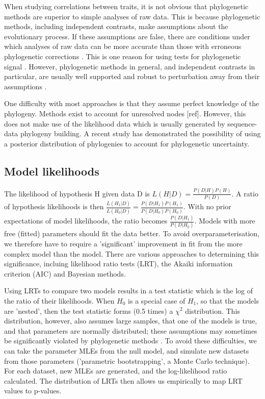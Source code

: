 \documentclass[12pt]{article}
\begin{document}
When studying correlations between traits, it is not obvious that phylogenetic methods are superior to simple analyses of raw data. 
This is because phylogenetic methods, including independent contrasts, make assumptions about the evolutionary process. 
If these assumptions are false, there are conditions under which analyses of raw data can be more accurate than those with erroneous phylogenetic corrections \citep{price_correlated_1997,harvey_comparative_2000}. 
This is one reason for using tests for phylogenetic signal \citep{pagel_inferring_1997,bjorklund_are_1997}. 
However, phylogenetic methods in general, and independent contrasts in particular, are usually well supported and robust to perturbation away from their assumptions \citep{harvey_phylogenetic_1998,martins_phylogenies_1997,diaz-uriarte_testing_1996}.

One difficulty with most approaches is that they assume perfect knowledge of the phylogeny. 
Methods exist to account for unresolved nodes [ref]. 
However, this does not make use of the likelihood data which is usually generated by sequence-data phylogeny building. 
A recent study \citep{blackburn_adaptive_2013} has demonstrated the possibility of using a posterior distribution of phylogenies to account for phylogenetic uncertainty.

\subsection{Model likelihoods}

The likelihood of hypothesis H given data D is $L(H|D) = \frac{P(D|H) P(H)}{P(D)}$. 
A ratio of hypothesis likelihoods is then $\frac{L(H_1|D)}{L(H_0|D)} = \frac{P(D|H_1)P(H_1)}{P(D|H_0)P(H_0)}$. 
With no prior expectations of model likelihoods, the ratio becomes $\frac{P(D|H_1)}{P(D|H_0)}$. 
Models with more free (fitted) parameters should fit the data better. 
To avoid overparameterisation, we therefore have to require a 'significant' improvement in fit from the more complex model than the model. 
There are various approaches to determining this significance, incluing likelihood ratio tests (LRT), the Akaiki information criterion (AIC) and Bayesian methods.

Using LRTs to compare two models results in a test statistic which is the log of the ratio of their likelihoods. 
When $H_0$ is a special case of $H_1$, so that the models are 'nested', then the test statistic forms (0.5 times) a $\chi ^2$ distribution. 
This distribution, however, also assumes large samples, that one of the models is true, and that parameters are normally distributed; these assumptions may sometimes be significantly violated by phylogenetic methods \citep{freckleton_seven_2009}. 
To avoid these difficulties, we can take the parameter MLEs from the null model, and simulate new datasets from those parameters ('parametric bootstrapping', a Monte Carlo technique). 
For each dataset, new MLEs are generated, and the log-likelihood ratio calculated. The distribution of LRTs then allows us empirically to map LRT values to p-values.
\end{document}
